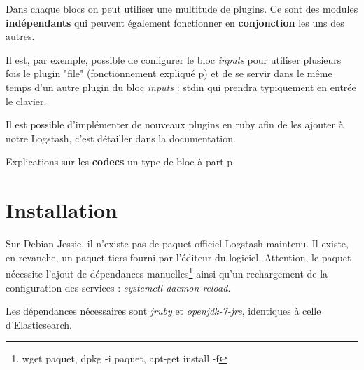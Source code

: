 Dans chaque blocs on peut utiliser une multitude de plugins. Ce sont des modules 
\textbf{indépendants} qui peuvent également fonctionner en \textbf{conjonction} les uns des autres.

Il est, par exemple, possible de configurer le bloc \emph{inputs} pour utiliser 
plusieurs fois le plugin "file" (fonctionnement expliqué p\pageref{lst:conflogstashiniteloop}) 
et de se servir dans le même temps d'un autre plugin du bloc \emph{inputs} : stdin 
qui prendra typiquement en entrée le clavier.


Il est possible d'implémenter de nouveaux plugins en ruby afin de les ajouter à
notre Logstash, c'est détailler dans la documentation. 

Explications sur les \textbf{codecs} un type de bloc à part p\pageref{subsec:logstashcodec}






\section{Installation}
%
%
%
%
%
%
%
%
%




Sur Debian Jessie, il n'existe pas de paquet officiel Logstash maintenu. Il existe,
en revanche, un paquet tiers
fourni par l'éditeur du logiciel. Attention, le paquet nécessite l'ajout de dépendances manuelles\footnote{wget paquet, 
dpkg -i paquet, apt-get install -f} ainsi qu'un rechargement de 
la configuration des services : \emph{systemctl daemon-reload}.

Les dépendances nécessaires sont \emph{jruby} et \emph{openjdk-7-jre}, identiques 
à celle d'Elasticsearch.

